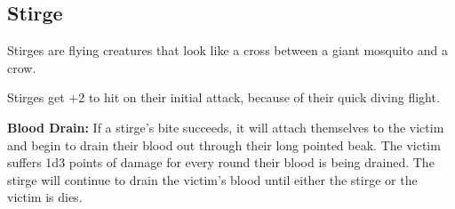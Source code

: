 \begin{multicols*}{2}
\subsection{Stirge}

Stirges are flying creatures that look like a cross between a giant mosquito and a crow.

Stirges get +2 to hit on their initial attack, because of their quick diving flight.

\textbf{Blood Drain:} If a stirge’s bite succeeds, it will attach themselves to the victim and begin to drain their blood out through their long pointed beak. The victim suffers 1d3 points of damage for every round their blood is being drained. The stirge will continue to drain the victim's blood until either the stirge or the victim is dies.


\end{multicols*}
